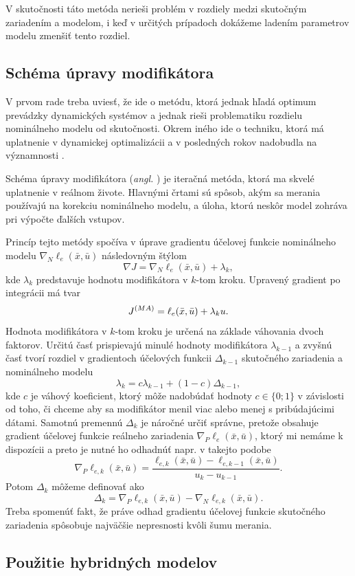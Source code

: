 V skutočnosti táto metóda nerieši problém v rozdiely medzi skutočným zariadením a modelom, i keď v určitých prípadoch dokážeme ladením parametrov modelu zmenšiť tento rozdiel.

\subsection{Schéma úpravy modifikátora}
V prvom rade treba uviesť, že ide o metódu, ktorá jednak hľadá optimum prevádzky dynamických systémov a jednak rieši problematiku rozdielu nominálneho modelu od skutočnosti. Okrem iného ide o techniku, ktorá má uplatnenie v dynamickej optimalizácii a v posledných rokov nadobudla na významnosti \cite{marchetti:modifier_adapt_scheme:2020}.

Schéma úpravy modifikátora (\textit{angl. }) je iteračná metóda, ktorá ma skvelé uplatnenie v reálnom živote. Hlavnými črtami sú spôsob, akým sa merania používajú na korekciu nominálneho modelu, a úloha, ktorú neskôr model zohráva pri výpočte ďalších vstupov.

Princíp tejto metódy spočíva v úprave gradientu účelovej funkcie nominálneho modelu $ \nabla_N\ell_e(\bar{x},\bar{u}) $ následovným štýlom
\begin{equation}
	\nabla J = \nabla_N\ell_e(\bar{x},\bar{u}) + \lambda_k,
\end{equation}
kde $ \lambda_k $ predstavuje hodnotu modifikátora v $ k $-tom kroku. Upravený gradient po integrácii má tvar 
\begin{equation}
	J^{\tiny{(MA)}} = \ell_e(\bar{x},\bar{u}) + \lambda_ku.
\end{equation}
Hodnota modifikátora v $ k $-tom kroku je určená na základe váhovania dvoch faktorov. Určitú časť prispievajú minulé hodnoty modifikátora $ \lambda_{k-1} $ a zvyšnú časť tvorí rozdiel v gradientoch účelových funkcii $ \Delta_{k-1} $ skutočného zariadenia a nominálneho modelu 
\begin{equation}
	\lambda_k = c\lambda_{k-1} + \left(1 - c\right)\Delta_{k-1},
\end{equation}
kde $ c $ je váhový koeficient, ktorý môže nadobúdať hodnoty $ c \in \lbrace 0; 1 \rbrace $ v závislosti od toho, či chceme aby sa modifikátor menil viac alebo menej s pribúdajúcimi dátami. Samotnú premennú $ \Delta_k $ je náročné určiť správne, pretože obsahuje gradient účelovej funkcie reálneho zariadenia $ \nabla_P\ell_e(\bar{x},\bar{u}) $, ktorý mi nemáme k dispozícii a preto je nutné ho odhadnúť napr. v takejto podobe
\begin{equation}
	\nabla_P\ell_{e,k}(\bar{x},\bar{u}) = \frac{\ell_{e,k}(\bar{x},\bar{u}) - \ell_{e,k-1}(\bar{x},\bar{u})}{u_k - u_{k-1}}.
\end{equation} 
Potom $ \Delta_k $ môžeme definovať ako 
\begin{equation}
	\Delta_k = \nabla_P\ell_{e,k}(\bar{x},\bar{u}) - \nabla_N\ell_{e,k}(\bar{x},\bar{u}).
\end{equation}
Treba spomenúť fakt, že práve odhad gradientu účelovej funkcie skutočného zariadenia spôsobuje najväčšie nepresnosti kvôli šumu merania. 

\subsection{Použitie hybridných modelov}
